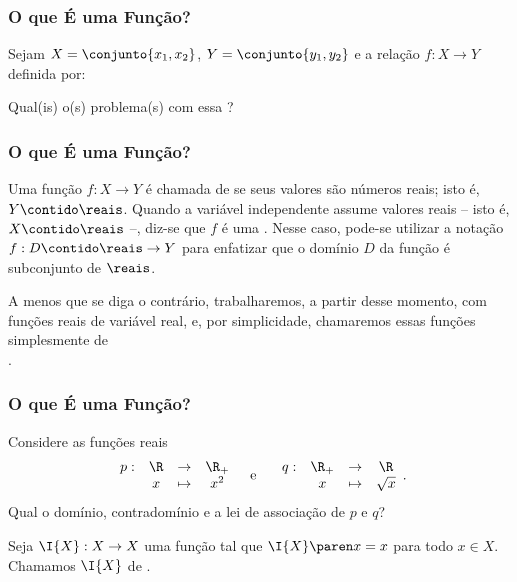 \begin{frame} \frametitle{O que É uma Função?} 

	\begin{exemplo}
		Sejam $X = \conjunto {x_1, x_2}$, $Y = \conjunto {y_1, y_2}$ e a relação $f: X \to Y$ definida por:
		\begin{center}
	   \end{center}

	   Qual(is) o(s) problema(s) com essa ?
	\end{exemplo}

\end{frame}


\begin{frame} \frametitle{O que É uma Função?} 
	
	\begin{definicao}
	Uma função  $f : X  \to Y $ é chamada de
	 se seus valores são números reais; isto é, $Y \contido \reais$. Quando a variável independente assume valores reais -- isto é, $X \contido \reais$ --, diz-se que $f$ é uma . Nesse caso, pode-se utilizar a notação $f : D \contido \reais \to Y$ para enfatizar que o domínio $D$ da função é subconjunto de $\reais$.
	\end{definicao} \pause

	A menos que se diga o contrário, trabalharemos, a partir desse momento, com funções
reais de variável real, e, por simplicidade, chamaremos essas funções simplesmente de \\
.


\end{frame}




\begin{frame}
\frametitle{O que É uma Função?} 
\begin{exemplo}
Considere as funções reais
$$\begin{array}{cccc}
p : & \R & \to     & \R_+ \\
		 &  x & \mapsto & x^2
\end{array}
\text{\ \ \  e \ \ \ }
\begin{array}{cccc}
q : & \R_+ & \to     & \R \\
		 &  x & \mapsto & \sqrt x
\end{array}.$$
Qual o domínio, contradomínio e a lei de associação de $p$ e $q$?
\end{exemplo}
\pause

\begin{exemplo}
Seja $\I{X} : X \to X $ uma função tal que $\I{X} \paren x = x$ para
todo $x \in X$. Chamamos $\I{X}$ de .
\end{exemplo}

\end{frame}


